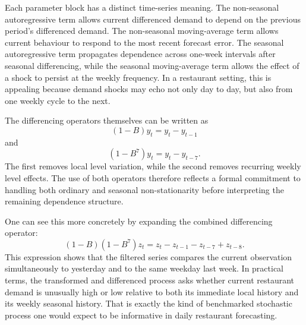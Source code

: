 \documentclass[11pt,oneside]{scrartcl}
\begin{document}
Each parameter block has a distinct time-series meaning. The non-seasonal autoregressive term allows current differenced demand to depend on the previous period's differenced demand. The non-seasonal moving-average term allows current behaviour to respond to the most recent forecast error. The seasonal autoregressive term propagates dependence across one-week intervals after seasonal differencing, while the seasonal moving-average term allows the effect of a shock to persist at the weekly frequency. In a restaurant setting, this is appealing because demand shocks may echo not only day to day, but also from one weekly cycle to the next.

The differencing operators themselves can be written as
\[
(1-B)y_t = y_t-y_{t-1}
\]
and
\[
(1-B^7)y_t = y_t-y_{t-7}.
\]
The first removes local level variation, while the second removes recurring weekly level effects. The use of both operators therefore reflects a formal commitment to handling both ordinary and seasonal non-stationarity before interpreting the remaining dependence structure.

One can see this more concretely by expanding the combined differencing operator:
\[
(1-B)(1-B^7)z_t = z_t - z_{t-1} - z_{t-7} + z_{t-8}.
\]
This expression shows that the filtered series compares the current observation simultaneously to yesterday and to the same weekday last week. In practical terms, the transformed and differenced process asks whether current restaurant demand is unusually high or low relative to both its immediate local history and its weekly seasonal history. That is exactly the kind of benchmarked stochastic process one would expect to be informative in daily restaurant forecasting.
\end{document}
